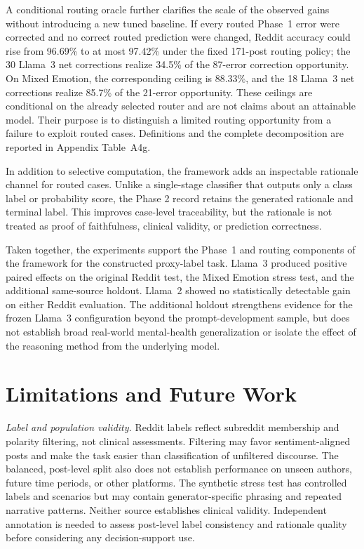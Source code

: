 \documentclass{ieeeaccess}
\begin{document}
A conditional routing oracle further clarifies the scale of the observed gains without introducing a new tuned baseline. If every routed Phase~1 error were corrected and no correct routed prediction were changed, Reddit accuracy could rise from 96.69\% to at most 97.42\% under the fixed 171-post routing policy; the 30 Llama~3 net corrections realize 34.5\% of the 87-error correction opportunity. On Mixed Emotion, the corresponding ceiling is 88.33\%, and the 18 Llama~3 net corrections realize 85.7\% of the 21-error opportunity. These ceilings are conditional on the already selected router and are not claims about an attainable model. Their purpose is to distinguish a limited routing opportunity from a failure to exploit routed cases. Definitions and the complete decomposition are reported in Appendix Table~A4g.

In addition to selective computation, the framework adds an inspectable rationale channel for routed cases. Unlike a single-stage classifier that outputs only a class label or probability score, the Phase 2 record retains the generated rationale and terminal label. This improves case-level traceability, but the rationale is not treated as proof of faithfulness, clinical validity, or prediction correctness.

Taken together, the experiments support the Phase~1 and routing components of the framework for the constructed proxy-label task. Llama~3 produced positive paired effects on the original Reddit test, the Mixed Emotion stress test, and the additional same-source holdout. Llama~2 showed no statistically detectable gain on either Reddit evaluation. The additional holdout strengthens evidence for the frozen Llama~3 configuration beyond the prompt-development sample, but does not establish broad real-world mental-health generalization or isolate the effect of the reasoning method from the underlying model.

\section{Limitations and Future Work}

\textit{Label and population validity.} Reddit labels reflect subreddit membership and polarity filtering, not clinical assessments. Filtering may favor sentiment-aligned posts and make the task easier than classification of unfiltered discourse. The balanced, post-level split also does not establish performance on unseen authors, future time periods, or other platforms. The synthetic stress test has controlled labels and scenarios but may contain generator-specific phrasing and repeated narrative patterns. Neither source establishes clinical validity. Independent annotation is needed to assess post-level label consistency and rationale quality before considering any decision-support use.
\end{document}
